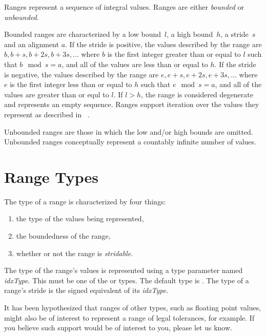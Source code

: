 \label{Ranges}

Ranges represent a sequence of integral values.  Ranges are
either \emph{bounded} or \emph{unbounded}.

Bounded ranges are characterized by a low bound~$l$, a high bound~$h$, a
stride~$s$ and an alignment $a$.  If the stride is positive, the values
described by the range are $b, b+s, b+2s, b+3s, ...$ where $b$ is the first
integer greater than or equal to $l$ such that $b \mod s = a$, and all of the
values are less than or equal to $h$.  If the stride is negative, the values
described by the range are $e, e+s, e+2s, e+3s, ...$ where $e$ is the first
integer less than or equal to $h$ such that $e \mod s = a$, and all of the
values are greater than or equl to $l$.  If $l > h$, the range is considered
degenerate and represents an empty sequence. Ranges support iteration over the
values they represent as described in ~.

Unbounded ranges are those in which the low and/or high bounds are
omitted.  Unbounded ranges conceptually represent a countably infinite
number of values.

\section{Range Types}
\label{Range_Types}

The type of a range is characterized by four things:
\begin{enumerate}
\item the type of the values being represented, 
\item the boundedness of the range,
\item whether or not the range is \emph{stridable}.
\end{enumerate}

The type of the range's values is represented using a type parameter
named \emph{idxType}.  This must be one of the  or
 types.  The default type is .
The type of a range's stride is the signed equivalent of its \emph{idxType}.

\begin{openissue}
It has been hypothesized that ranges of other types, such as floating
point values, might also be of interest to represent a range of legal
tolerances, for example.  If you believe such support would be of
interest to you, please let us know.
\end{openissue}


